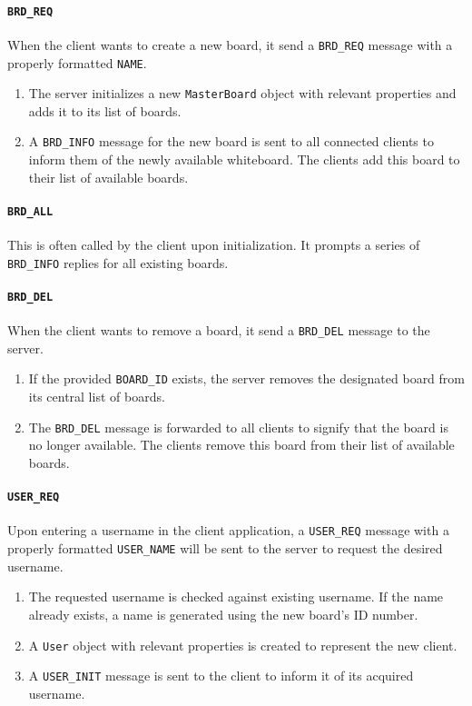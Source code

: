 \paragraph{\texttt{BRD\_REQ}} When the client wants to create a new board, it send a \texttt{BRD\_REQ} message with a properly formatted \texttt{NAME}.
\begin{enumerate}
\item The server initializes a new \texttt{MasterBoard} object with relevant properties and adds it to its list of boards.
\item A \texttt{BRD\_INFO} message for the new board is sent to all connected clients to inform them of the newly available whiteboard. The clients add this board to their list of available boards.
\end{enumerate}

\paragraph{\texttt{BRD\_ALL}} This is often called by the client upon initialization. It prompts a series of \texttt{BRD\_INFO} replies for all existing boards.

\paragraph{\texttt{BRD\_DEL}} When the client wants to remove a board, it send a \texttt{BRD\_DEL} message to the server.
\begin{enumerate}
\item If the provided \texttt{BOARD\_ID} exists, the server removes the designated board from its central list of boards.
\item The \texttt{BRD\_DEL} message is forwarded to all clients to signify that the board is no longer available. The clients remove this board from their list of available boards.
\end{enumerate}

\paragraph{\texttt{USER\_REQ}} Upon entering a username in the client application, a \texttt{USER\_REQ} message with a properly formatted \texttt{USER\_NAME} will be sent to the server to request the desired username.
\begin{enumerate}
\item The requested username is checked against existing username. If the name already exists, a name is generated using the new board's ID number.
\item A \texttt{User} object with relevant properties is created to represent the new client.
\item A \texttt{USER\_INIT} message is sent to the client to inform it of its acquired username.
\end{enumerate}

